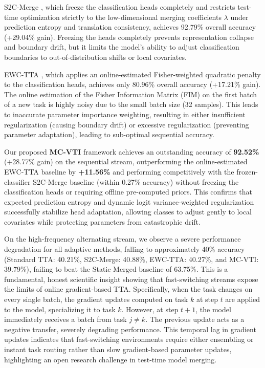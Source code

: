 \documentclass{article}
\theoremstyle{plain}
\theoremstyle{definition}
\theoremstyle{remark}
\begin{document}
S2C-Merge \cite{s2c2026teacher}, which freeze the classification heads completely and restricts test-time optimization strictly to the low-dimensional merging coefficients $\lambda$ under prediction entropy and translation consistency, achieves 92.79\% overall accuracy (+29.04\% gain). Freezing the heads completely prevents representation collapse and boundary drift, but it limits the model's ability to adjust classification boundaries to out-of-distribution shifts or local covariates.

EWC-TTA \cite{ewc2026elastic}, which applies an online-estimated Fisher-weighted quadratic penalty to the classification heads, achieves only 80.96\% overall accuracy (+17.21\% gain). The online estimation of the Fisher Information Matrix (FIM) on the first batch of a new task is highly noisy due to the small batch size (32 samples). This leads to inaccurate parameter importance weighting, resulting in either insufficient regularization (causing boundary drift) or excessive regularization (preventing parameter adaptation), leading to sub-optimal sequential accuracy.

Our proposed \textbf{MC-VTI} framework achieves an outstanding accuracy of \textbf{92.52\%} (+28.77\% gain) on the sequential stream, outperforming the online-estimated EWC-TTA baseline by \textbf{+11.56\%} and performing competitively with the frozen-classifier S2C-Merge baseline (within 0.27\% accuracy) without freezing the classification heads or requiring offline pre-computed priors. This confirms that expected prediction entropy and dynamic logit variance-weighted regularization successfully stabilize head adaptation, allowing classes to adjust gently to local covariates while protecting parameters from catastrophic drift.

On the high-frequency alternating stream, we observe a severe performance degradation for all adaptive methods, falling to approximately 40\% accuracy (Standard TTA: 40.21\%, S2C-Merge: 40.88\%, EWC-TTA: 40.27\%, and MC-VTI: 39.79\%), failing to beat the Static Merged baseline of 63.75\%. This is a fundamental, honest scientific insight showing that fast-switching streams expose the limits of online gradient-based TTA. Specifically, when the task changes on every single batch, the gradient updates computed on task $k$ at step $t$ are applied to the model, specializing it to task $k$. However, at step $t+1$, the model immediately receives a batch from task $j \neq k$. The previous update acts as a negative transfer, severely degrading performance. This temporal lag in gradient updates indicates that fast-switching environments require either ensembling or instant task routing rather than slow gradient-based parameter updates, highlighting an open research challenge in test-time model merging.
\end{document}
